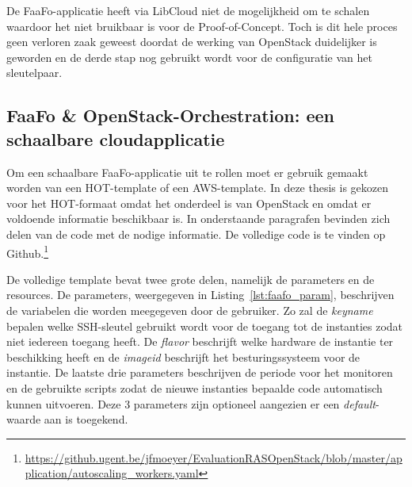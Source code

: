De FaaFo-applicatie heeft via LibCloud niet de mogelijkheid om te schalen waardoor het niet bruikbaar is voor de Proof-of-Concept. Toch is dit hele proces geen verloren zaak geweest doordat de werking van OpenStack duidelijker is geworden en de derde stap nog gebruikt wordt voor de configuratie van het sleutelpaar.

\subsection{FaaFo \& OpenStack-Orchestration: een schaalbare cloudapplicatie}
\label{sec:faafo_template}

Om een schaalbare FaaFo-applicatie uit te rollen moet er gebruik gemaakt worden van een HOT-template of een AWS-template. In deze thesis is gekozen voor het HOT-formaat omdat het onderdeel is van OpenStack en omdat er voldoende informatie beschikbaar is. In onderstaande paragrafen bevinden zich delen van de code met de nodige informatie. De volledige code is te vinden op Github.\footnote{\url{https://github.ugent.be/jfmoeyer/EvaluationRASOpenStack/blob/master/application/autoscaling_workers.yaml}}

De volledige template bevat twee grote delen, namelijk de parameters en de resources. De parameters, weergegeven in Listing~\ref{lst:faafo_param}, beschrijven de variabelen die worden meegegeven door de gebruiker. Zo zal de \textit{key\textunderscore name} bepalen welke SSH-sleutel gebruikt wordt voor de toegang tot de instanties zodat niet iedereen toegang heeft. De \textit{flavor} beschrijft welke hardware de instantie ter beschikking heeft en de \textit{image\textunderscore id} beschrijft het besturingssysteem voor de instantie. De laatste drie parameters beschrijven de periode voor het monitoren en de gebruikte scripts zodat de nieuwe instanties bepaalde code automatisch kunnen uitvoeren. Deze 3 parameters zijn optioneel aangezien er een \textit{default}-waarde aan is toegekend.


